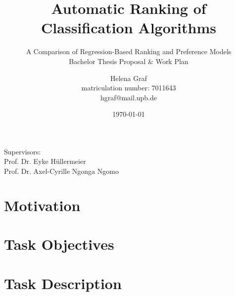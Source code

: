 \documentclass[12pt]{scrartcl}
\begin{document}
\title{Automatic Ranking of Classification Algorithms}
\subtitle{A Comparison of Regression-Based Ranking and Preference Models
\\\vspace{2em}Bachelor Thesis Proposal \& Work Plan}

\author{Helena Graf\\ 
\small{matriculation number: 7011643}\\ 
\small{hgraf@mail.upb.de}}
\date{\today}

\maketitle
\vspace{2em}

\begin{center}
\small{Supervisors:}\\
\large{Prof. Dr. Eyke H\"ullermeier}\\
\large{Prof. Dr. Axel-Cyrille Ngonga Ngomo}
\end{center}

\newpage
\tableofcontents
\newpage

\section{Motivation}\label{sec:motivation}

\section{Task Objectives}\label{sec:task-objectives}

\section{Task Description}\label{sec:task-description}

\newpage
\end{document}
